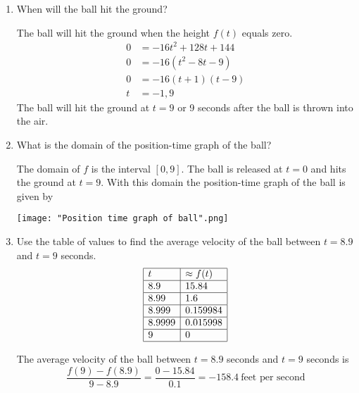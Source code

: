 \documentclass[nooutcomes]{ximera}
\begin{document}
\begin{problem}
\begin{enumerate}
\begin{freeResponse}
		\end{freeResponse}
		
		\item  When will the ball hit the ground?
		\begin{freeResponse}		 
		The ball will hit the ground when the height $f(t)$ equals zero.
			\begin{align*}
			0&=-16t^2+128t+144 \\
			0&=-16(t^2-8t-9) \\
 			0&=-16(t+1)(t-9) \\
 			t&=-1,9 
 			\end{align*}
		The ball will hit the ground at $t=9$ or 9 seconds after the ball is thrown into the air.  
		\end{freeResponse}

		\item  What is the domain of the position-time graph of the ball?

		 \begin{freeResponse}
     	   The domain of $f$ is the interval $[0, 9]$.  The ball is released at $t=0$ and hits the ground at $t=9$.
     	   With this domain the position-time graph of the ball is given by
       		 \begin{center}
       	  	 \texttt{[image: "Position time graph of ball".png]}
        		\end{center}
     	 \end{freeResponse}

		
		
		\item Use the table of values to find the average velocity of the ball between $t=8.9$ and $t=9$ seconds.
	\[
\begin{array}{|l|l|}
			\hline
			t & \approx f(t)  \\
			\hline
			8.9 & 15.84  \\
			\hline
			8.99 & 1.6  \\
			\hline
			8.999 & 0.159984  \\
			\hline
			8.9999 &  0.015998  \\
			\hline
			9 &  0  \\
			\hline
			\end{array}
		\]
  \begin{freeResponse}
    The average velocity of the ball between $t = 8.9$ seconds and $t = 9$ seconds is
    \[
       \frac{f(9) - f(8.9)}{9- 8.9} = \frac{0- 15.84}{0.1} = -158.4\  \text{feet per second}
    \]
  \end{freeResponse}



\end{enumerate}
\end{problem}
\end{document}

